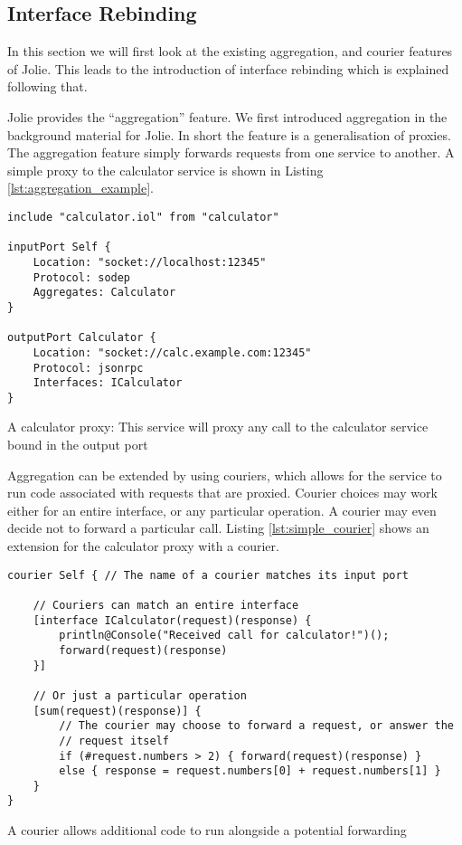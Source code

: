 \subsection{Interface Rebinding}
\label{sec:interface_rebinding}

In this section we will first look at the existing aggregation, and courier
features of Jolie. This leads to the introduction of interface rebinding which
is explained following that.

Jolie provides the ``aggregation'' feature. We first introduced aggregation in
the background material for Jolie. In short the feature is a generalisation of
proxies. The aggregation feature simply forwards requests from one service to
another. A simple proxy to the calculator service is shown in Listing
\ref{lst:aggregation_example}.

\begin{listing}[H]
\begin{verbatim}
include "calculator.iol" from "calculator"

inputPort Self {
    Location: "socket://localhost:12345"
    Protocol: sodep
    Aggregates: Calculator
}

outputPort Calculator {
    Location: "socket://calc.example.com:12345"
    Protocol: jsonrpc
    Interfaces: ICalculator
}
\end{verbatim}

\caption{A calculator proxy: This service will proxy any call to the calculator
    service bound in the output port }

\label{lst:aggregation_example}

\end{listing}

Aggregation can be extended by using couriers, which allows for the service to
run code associated with requests that are proxied. Courier choices may work
either for an entire interface, or any particular operation. A courier may even
decide not to forward a particular call. Listing \ref{lst:simple_courier} shows
an extension for the calculator proxy with a courier.

\begin{listing}[H]
\begin{verbatim}
courier Self { // The name of a courier matches its input port

    // Couriers can match an entire interface
    [interface ICalculator(request)(response) {
        println@Console("Received call for calculator!")();
        forward(request)(response)
    }]

    // Or just a particular operation
    [sum(request)(response)] {
        // The courier may choose to forward a request, or answer the
        // request itself
        if (#request.numbers > 2) { forward(request)(response) }
        else { response = request.numbers[0] + request.numbers[1] }
    }
}
\end{verbatim}

\caption{A courier allows additional code to run alongside a potential
    forwarding}

\label{lst:simple_courier}

\end{listing}

